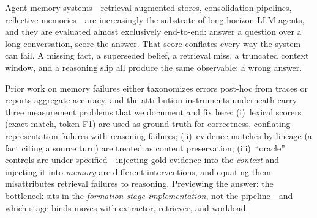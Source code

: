 \documentclass[11pt]{article}
\begin{document}
Agent memory systems---retrieval-augmented stores, consolidation pipelines,
reflective memories---are increasingly the substrate of long-horizon LLM
agents, and they are evaluated almost exclusively end-to-end: answer a
question over a long conversation, score the answer. That score conflates
every way the system can fail. A missing fact, a superseded belief, a
retrieval miss, a truncated context window, and a reasoning slip all produce
the same observable: a wrong answer.

Prior work on memory failures either taxonomizes errors post-hoc from traces
or reports aggregate accuracy, and the attribution instruments underneath
carry three measurement problems that we document and fix here: (i)~lexical
scorers (exact match, token F1) are used as ground truth for correctness,
conflating representation failures with reasoning failures; (ii)~evidence
matches by lineage (a fact citing a source turn) are treated as content
preservation; (iii)~``oracle'' controls are under-specified---injecting gold
evidence into the \emph{context} and injecting it into \emph{memory} are
different interventions, and equating them misattributes retrieval failures
to reasoning. Previewing the answer: the bottleneck sits in the
\emph{formation-stage implementation}, not the pipeline---and which stage
binds moves with extractor, retriever, and workload.
\end{document}
